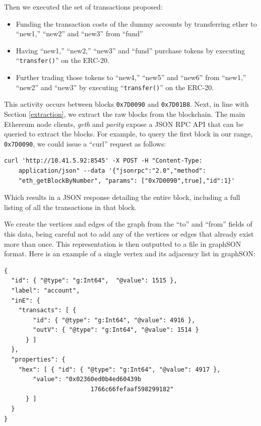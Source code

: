 \documentclass[conference]{IEEEtran}
\begin{document}
Then we executed the set of transactions proposed:
\begin{itemize}
    \item Funding the transaction costs of the dummy accounts by transferring ether to ``new1,'' ``new2'' and ``new3'' from ``fund''
    \item Having ``new1,'' ``new2,'' ``new3'' and ``fund'' purchase tokens by executing ``{\tiny\texttt{transfer()}}'' on the ERC-20.
    \item Further trading those tokens to ``new4,'' ``new5'' and ``new6'' from ``new1,'' ``new2'' and ``new3'' by executing ``{\tiny\texttt{transfer()}}'' on the ERC-20.
\end{itemize}

This activity occurs between blocks {\tiny\texttt{0x7D0090}} and {\tiny\texttt{0x7D01B8}}.  Next, in line with Section \ref{extraction}, we extract the raw blocks from the blockchain.  The main Ethereum node clients, \emph{geth} and \emph{parity}\cite{pustivsek2018approaches} expose a JSON RPC API that can be queried to extract the blocks. For example, to query the first block in our range, {\tiny\texttt{0x7D0090}}, we could issue a ``curl''\cite{powers2003unix} request as follows:

\begin{lstlisting}[basicstyle=\tiny]
    curl 'http://10.41.5.92:8545' -X POST -H "Content-Type: 
    application/json" --data '{"jsonrpc":"2.0","method":
    "eth_getBlockByNumber", "params": ["0x7D0090",true],"id":1}'
\end{lstlisting}

Which results in a JSON\cite{crockford2006application} response detailing the entire block, including a full listing of all the transactions in that block. 

We create the vertices and edges of the graph from the ``to'' and ``from'' fields of this data, being careful not to add any of the vertices or edges that already exist more than once.  This representation is then outputted to a file in graphSON\cite{tomaszuk2016rdf}  format.  Here is an example of a single vertex and its adjacency list in graphSON:

\begin{lstlisting}[basicstyle=\tiny]
{
  "id": { "@type": "g:Int64",  "@value": 1515 },
  "label": "account",
  "inE": {
    "transacts": [ {
        "id": { "@type": "g:Int64", "@value": 4916 },
        "outV": { "@type": "g:Int64", "@value": 1514 }
      } ]
  },
  "properties": {
    "hex": [ { "id": { "@type": "g:Int64", "@value": 4917 },
        "value": "0x02360ed0b4ed60439b
                        1766c66fefaaf598299182"
      } ]
  }
}
\end{lstlisting}
\end{document}
